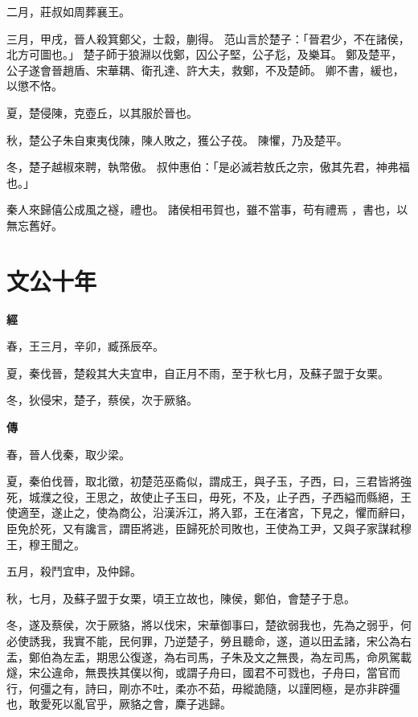 \documentclass{ctexart}
\begin{document}
二月，莊叔如周葬襄王。

三月，甲戌，晉人殺箕鄭父，士縠，蒯得。
范山言於楚子：「晉君少，不在諸侯，北方可圖也。」
楚子師于狼淵以伐鄭，囚公子堅，公子尨，及樂耳。
鄭及楚平，公子遂會晉趙盾、宋華耦、衛孔達、許大夫，救鄭，不及楚師。
卿不書，緩也，以懲不恪。

夏，楚侵陳，克壺丘，以其服於晉也。

秋，楚公子朱自東夷伐陳，陳人敗之，獲公子茷。
陳懼，乃及楚平。

冬，楚子越椒來聘，執幣傲。
叔仲惠伯：「是必滅若敖氏之宗，傲其先君，神弗福也。」

秦人來歸僖公成風之襚，禮也。
諸侯相弔賀也，雖不當事，苟有禮焉 ，書也，以無忘舊好。





\section{文公十年}


\textbf{經}



春，王三月，辛卯，臧孫辰卒。

夏，秦伐晉，楚殺其大夫宜申，自正月不雨，至于秋七月，及蘇子盟于女栗。

冬，狄侵宋，楚子，蔡侯，次于厥貉。

\textbf{傳}



春，晉人伐秦，取少梁。

夏，秦伯伐晉，取北徵，初楚范巫矞似，謂成王，與子玉，子西，曰，三君皆將強死，城濮之役，王思之，故使止子玉曰，毋死，不及，止子西，子西縊而縣絕，王使適至，遂止之，使為商公，沿漢泝江，將入郢，王在渚宮，下見之，懼而辭曰，臣免於死，又有讒言，謂臣將逃，臣歸死於司敗也，王使為工尹，又與子家謀弒穆王，穆王聞之。

五月，殺鬥宜申，及仲歸。

秋，七月，及蘇子盟于女栗，頃王立故也，陳侯，鄭伯，會楚子于息。

冬，遂及蔡侯，次于厥貉，將以伐宋，宋華御事曰，楚欲弱我也，先為之弱乎，何必使誘我，我實不能，民何罪，乃逆楚子，勞且聽命，遂，道以田孟諸，宋公為右盂，鄭伯為左盂，期思公復遂，為右司馬，子朱及文之無畏，為左司馬，命夙駕載燧，宋公違命，無畏抶其僕以徇，或謂子舟曰，國君不可戮也，子舟曰，當官而行，何彊之有，詩曰，剛亦不吐，柔亦不茹，毋縱詭隨，以謹罔極，是亦非辟彊也，敢愛死以亂官乎，厥貉之會，麇子逃歸。
\end{document}
